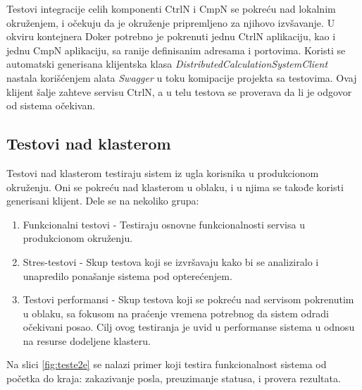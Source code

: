 \documentclass[12pt,oneside]{memoir}
\begin{document}
Testovi integracije celih komponenti CtrlN i CmpN se pokreću nad lokalnim okruženjem, i očekuju da je okruženje pripremljeno za njihovo izvšavanje. U okviru kontejnera Doker potrebno je pokrenuti jednu CtrlN aplikaciju, kao i jednu CmpN aplikaciju, sa ranije definisanim adresama i portovima. Koristi se automatski generisana klijentska klasa \emph{DistributedCalculationSystemClient} nastala korišćenjem alata \emph{Swagger} u toku komipacije projekta sa testovima. Ovaj klijent šalje zahteve servisu CtrlN, a u telu testova se proverava da li je odgovor od sistema očekivan.

\subsection{Testovi nad klasterom}

Testovi nad klasterom testiraju sistem iz ugla korisnika u produkcionom okruženju. Oni se pokreću nad klasterom u oblaku, i u njima se takođe koristi generisani klijent. Dele se na nekoliko grupa:
\begin{enumerate}
\item Funkcionalni testovi - Testiraju osnovne funkcionalnosti servisa u produkcionom okruženju.
\item Stres-testovi - Skup testova koji se izvršavaju kako bi se analiziralo i unapredilo ponašanje sistema pod opterećenjem. 
\item Testovi performansi - Skup testova koji se pokreću nad servisom pokrenutim u oblaku, sa fokusom na praćenje vremena potrebnog da sistem odradi očekivani posao. Cilj ovog testiranja je uvid u performanse sistema u odnosu na resurse dodeljene klasteru.
\end{enumerate}

Na slici \ref{fig:teste2e} se nalazi primer koji testira funkcionalnost sistema od početka do kraja: zakazivanje posla, preuzimanje statusa, i provera rezultata.
\end{document}
